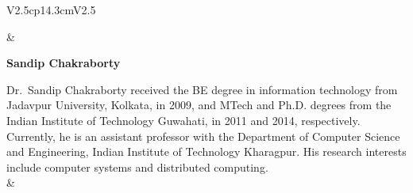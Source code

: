 \begin{tabular}{V{2.5}cp{14.3cm}V{2.5}}

 & 

\centerline{\large\bf Sandip Chakraborty}

\bigskip
Dr.~Sandip Chakraborty received the BE degree in information technology from Jadavpur University, Kolkata, in 2009, and MTech and Ph.D. degrees from the Indian Institute of Technology Guwahati, in 2011 and 2014, respectively. Currently, he is an assistant professor with the Department of Computer Science and Engineering, Indian Institute of Technology Kharagpur. His research interests include computer systems and distributed computing.\\
&\\
\end{tabular}




